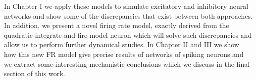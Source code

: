 In Chapter I we apply these models to simulate excitatory and inhibitory
neural networks and show some of the discrepancies that exist between
both approaches. In addition, we present a novel firing rate model,
exactly derived from the quadratic-integrate-and-fire model neuron
which will solve such discrepancies and allow us to perform further
dynamical studies. In Chapter II and III we show how this new FR model
give precise results of networks of spiking neurons and we extract
some interesting mechanistic conclusions which we discuss in the final
section of this work.

\cleardoublepage

